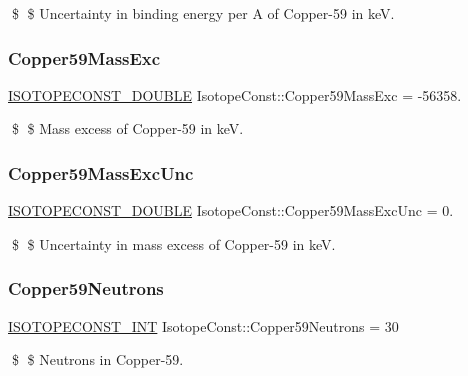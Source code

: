 \$ \$ Uncertainty in binding energy per A of Copper-\/59 in keV. \mbox{\label{group___isotope_const-_copper-_cu59_ga03f835156ff672ceed0d3bc6c8b4a1ff}} 
\subsubsection{\texorpdfstring{Copper59\+Mass\+Exc}{Copper59MassExc}}
{\footnotesize\ttfamily \mbox{\hyperlink{group___isotope_const-_macros_ga8f45a7272ce02c0b4c65c44636ed719a}{I\+S\+O\+T\+O\+P\+E\+C\+O\+N\+S\+T\+\_\+\+D\+O\+U\+B\+LE}} Isotope\+Const\+::\+Copper59\+Mass\+Exc = -\/56358.}

\$ \$ Mass excess of Copper-\/59 in keV. \mbox{\label{group___isotope_const-_copper-_cu59_ga0911409280caa6538af05b55449e8a83}} 
\subsubsection{\texorpdfstring{Copper59\+Mass\+Exc\+Unc}{Copper59MassExcUnc}}
{\footnotesize\ttfamily \mbox{\hyperlink{group___isotope_const-_macros_ga8f45a7272ce02c0b4c65c44636ed719a}{I\+S\+O\+T\+O\+P\+E\+C\+O\+N\+S\+T\+\_\+\+D\+O\+U\+B\+LE}} Isotope\+Const\+::\+Copper59\+Mass\+Exc\+Unc = 0.}

\$ \$ Uncertainty in mass excess of Copper-\/59 in keV. \mbox{\label{group___isotope_const-_copper-_cu59_ga8003aaa5b957bdaa602af583e5bec245}} 
\subsubsection{\texorpdfstring{Copper59\+Neutrons}{Copper59Neutrons}}
{\footnotesize\ttfamily \mbox{\hyperlink{group___isotope_const-_macros_ga5f18360b3e99483a35c32d789e62621c}{I\+S\+O\+T\+O\+P\+E\+C\+O\+N\+S\+T\+\_\+\+I\+NT}} Isotope\+Const\+::\+Copper59\+Neutrons = 30}

\$ \$ Neutrons in Copper-\/59. \mbox{\label{group___isotope_const-_copper-_cu59_ga25d7c4965ace68ada08dd6e426f8eb51}} 
